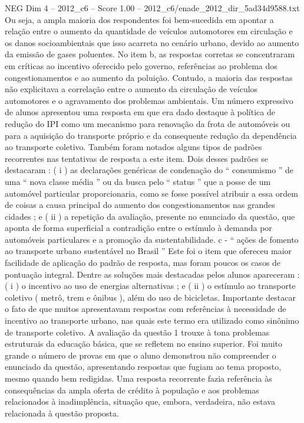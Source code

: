\begin{textsample}{NEG Dim 4 – 2012\_c6 – Score 1.00 – 2012\_c6/enade\_2012\_dir\_5ad34d9588.txt}
Ou seja, a ampla maioria dos respondentes foi bem-sucedida em apontar a relação entre o aumento da quantidade de veículos automotores em circulação e os danos socioambientais que isso acarreta no cenário urbano, devido ao aumento da emissão de gases poluentes.
No item b, as respostas corretas se concentraram em críticas ao incentivo oferecido pelo governo, referências ao problema dos congestionamentos e ao aumento da poluição.
Contudo, a maioria das respostas não explicitava a correlação entre o aumento da circulação de veículos automotores e o agravamento dos problemas ambientais.
Um número expressivo de alunos apresentou uma resposta em que era dado destaque à política de redução do IPI como um mecanismo para renovação da frota de automóveis ou para a aquisição do transporte próprio e da consequente redução da dependência ao transporte coletivo.
Também foram notados alguns tipos de padrões recorrentes nas tentativas de resposta a este item.
Dois desses padrões se destacaram : ( i ) as declarações genéricas de condenação do “ consumismo ” de uma “ nova classe média ” ou da busca pelo “ status ” que a posse de um automóvel particular proporcionaria, como se fosse possível atribuir a essa ordem de coisas a causa principal do aumento dos congestionamentos nas grandes cidades ; e ( ii ) a repetição da avaliação, presente no enunciado da questão, que aponta de forma superficial a contradição entre o estímulo à demanda por automóveis particulares e a promoção da sustentabilidade. c - “ ações de fomento ao transporte urbano sustentável no Brasil ” Este foi o item que ofereceu maior facilidade de aplicação do padrão de resposta, mas foram poucos os casos de pontuação integral.
Dentre as soluções mais destacadas pelos alunos apareceram : ( i ) o incentivo ao uso de energias alternativas ; e ( ii ) o estímulo ao transporte coletivo ( metrô, trem e ônibus ), além do uso de bicicletas.
Importante destacar o fato de que muitos apresentavam respostas com referências à necessidade de incentivo ao transporte urbano, nas quais este termo era utilizado como sinônimo de transporte coletivo.
A avaliação da questão 1 trouxe à tona problemas estruturais da educação básica, que se refletem no ensino superior.
Foi muito grande o número de provas em que o aluno demonstrou não compreender o enunciado da questão, apresentando respostas que fugiam ao tema proposto, mesmo quando bem redigidas.
Uma resposta recorrente fazia referência às consequências da ampla oferta de crédito à população e aos problemas relacionados à inadimplência, situação que, embora, verdadeira, não estava relacionada à questão proposta.

\end{textsample}
